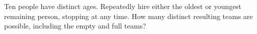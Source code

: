 Ten people have distinct ages. Repeatedly hire either the oldest or youngest remaining person, stopping at any time. How many distinct resulting teams are possible, including the empty and full teams?

